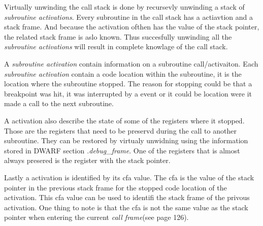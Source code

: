  


Virtually unwinding the call stack is done by recursevly unwinding a stack of \emph{subroutine activations}.
Every subroutine in the call stack has a actiavtion and a stack frame.
And because the activation ofthen has the value of the stack pointer, the related stack frame is aslo known.
Thus succesfully unwinding all the \emph{subroutine activations} will result in complete knowlage of the call stack.


A \emph{subroutine activation} contain information on a subroutine call/activaiton.
Each \emph{subroutine activation} contain a code location within the subroutine, it is the location where the subroutine stopped.
The reason for stopping could be that a breakpoint was hit, it was interrupted by a event or it could be location were it made a call to the next subroutine.


A activation also describe the state of some of the registers where it stopped.
Those are the registers that need to be preservd during the call to another subroutine.
They can be restored by virtualy unwidning using the information stored in \gls{DWARF} section \emph{.debug\_frame}.
One of the registers that is almost always presered is the register with the stack pointer.


Lastly a activation is identified by its \gls{cfa} value. 
The \gls{cfa} is the value of the stack pointer in the previous stack frame for the stopped code location of the activation.
This \gls{cfa} value can be used to identifi the stack frame of the privous activation.
One thing to note is that the \gls{cfa} is not the same value as the stack pointer when entering the current \emph{call frame}(see \cite{dwarf} page 126).



